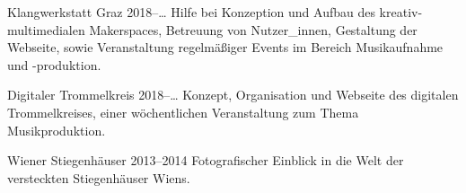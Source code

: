%
%

\begin{projects}
	\project
	{Klangwerkstatt Graz}
	{2018–…}
	{}
	{
		Hilfe bei Konzeption und Aufbau des kreativ-multimedialen Makerspaces,
		Betreuung von Nutzer\_innen, Gestaltung der Webseite, sowie
		Veranstaltung regelmäßiger Events im Bereich Musikaufnahme und
		-produktion.
	}
	{}

	\project
	{Digitaler Trommelkreis}
	{2018–…}
	{}
	{
		Konzept, Organisation und Webseite des digitalen Trommelkreises, einer
		wöchentlichen Veranstaltung zum Thema Musikproduktion.
	}
	{}

	\project
	{Wiener Stiegenhäuser}
	{2013–2014}
	{}
	{
		Fotografischer Einblick in die Welt der versteckten Stiegenhäuser Wiens.
	}
	{}
\end{projects}